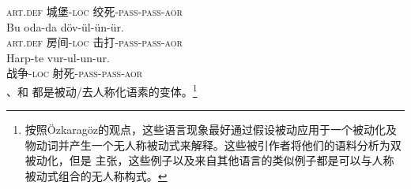      \textsc{art}.\textsc{def} 城堡-\textsc{loc} 绞死-\textsc{pass}-\textsc{pass}-\textsc{aor}\\
\ex\label{ex-double-passivization-hit}
\gll Bu oda-da döv-ül-ün-ür.\\
     \textsc{art}.\textsc{def} 房间-\textsc{loc} 击打-\textsc{pass}-\textsc{pass}-\textsc{aor}\\
\ex
\gll Harp-te vur-ul-un-ur.\\
     战争-\textsc{loc} 射死-\textsc{pass}-\textsc{pass}-\textsc{aor}\\
\zl
{}、和 都是被动/去人称化语素的变体。\footnote{按照Özkara\-göz的观点，这些语言现象最好通过假设被动应用于一个被动化及物动词并产生一个无人称被动式来解释。这些被引作者将他们的语料分析为双被动化，但是 \citet{Blevins2003a}主张，这些例子以及来自其他语言的类似例子都是可以与人称被动式组合的无人称构式。}

